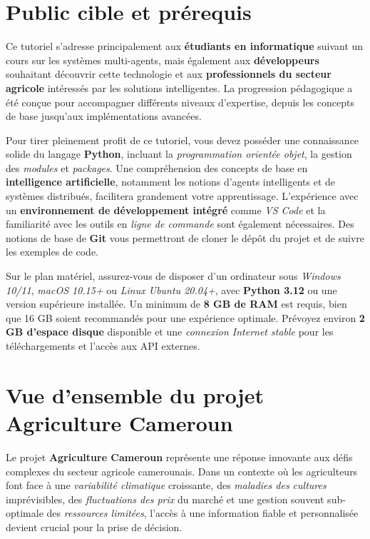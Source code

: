 \section*{Public cible et prérequis}

Ce tutoriel s'adresse principalement aux \textbf{étudiants en informatique} suivant un cours sur les systèmes multi-agents, mais également aux \textbf{développeurs} souhaitant découvrir cette technologie et aux \textbf{professionnels du secteur agricole} intéressés par les solutions intelligentes. La progression pédagogique a été conçue pour accompagner différents niveaux d'expertise, depuis les concepts de base jusqu'aux implémentations avancées.

Pour tirer pleinement profit de ce tutoriel, vous devez posséder une connaissance solide du langage \textbf{Python}, incluant la \emph{programmation orientée objet}, la gestion des \emph{modules} et \emph{packages}. Une compréhension des concepts de base en \textbf{intelligence artificielle}, notamment les notions d'agents intelligents et de systèmes distribués, facilitera grandement votre apprentissage. L'expérience avec un \textbf{environnement de développement intégré} comme \emph{VS Code} et la familiarité avec les outils en \emph{ligne de commande} sont également nécessaires. Des notions de base de \textbf{Git} vous permettront de cloner le dépôt du projet et de suivre les exemples de code.

Sur le plan matériel, assurez-vous de disposer d'un ordinateur sous \emph{Windows 10/11}, \emph{macOS 10.15+} ou \emph{Linux Ubuntu 20.04+}, avec \textbf{Python 3.12} ou une version supérieure installée. Un minimum de \textbf{8 GB de RAM} est requis, bien que 16 GB soient recommandés pour une expérience optimale. Prévoyez environ \textbf{2 GB d'espace disque} disponible et une \emph{connexion Internet stable} pour les téléchargements et l'accès aux API externes.

\section*{Vue d'ensemble du projet Agriculture Cameroun}

Le projet \textbf{Agriculture Cameroun} représente une réponse innovante aux défis complexes du secteur agricole camerounais. Dans un contexte où les agriculteurs font face à une \emph{variabilité climatique} croissante, des \emph{maladies des cultures} imprévisibles, des \emph{fluctuations des prix} du marché et une gestion souvent sub-optimale des \emph{ressources limitées}, l'accès à une information fiable et personnalisée devient crucial pour la prise de décision.

